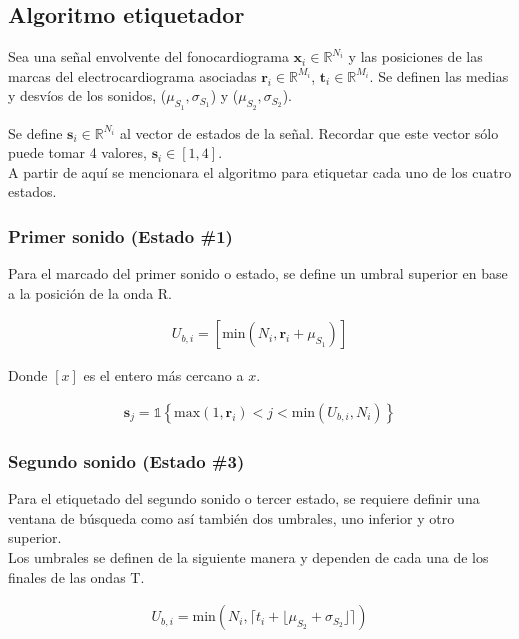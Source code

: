 \subsection*{Algoritmo etiquetador}

\indent Sea una señal envolvente del fonocardiograma $\bm{x}_i \in \mathbb{R}^{N_i}$ y las posiciones de las marcas del electrocardiograma asociadas $\bm{r}_i \in \mathbb{R}^{M_i}$, $\mathbf{t}_i \in \mathbb{R}^{M_i}$. Se definen las medias y desvíos de los sonidos, ($\mu_{S_1}, \sigma_{S_1}$) y ($\mu_{S_2}, \sigma_{S_2}$). \bigskip

\indent Se define $\mathbf{s}_i \in \mathbb{R}^{N_i}$ al vector de estados de la señal. Recordar que este vector sólo puede tomar 4 valores, $\mathbf{s}_i \in [1,4]$. \\
\indent A partir de aquí se mencionara el algoritmo para etiquetar cada uno de los cuatro estados.

\subsubsection*{Primer sonido (Estado \#1)}

\indent Para el marcado del primer sonido o estado, se define un umbral superior en base a la posición de la onda R. 

\begin{align}
    U_{b,i} = \left[\mathrm{min}(N_i,\mathbf{r}_i+\mu_{S_1})\right] 
\end{align}

\indent Donde $[x]$ es el entero más cercano a $x$.

\begin{align}
    \bm{s}_j = \mathds{1}\left\{\mathrm{max}(1, \mathbf{r}_i) < j < \mathrm{min}(U_{b,i}, N_i)\right\}
\end{align}

\subsubsection*{Segundo sonido (Estado \#3)}

\indent Para el etiquetado del segundo sonido o tercer estado, se requiere definir una ventana de búsqueda como así también dos umbrales, uno inferior y otro superior. \\
\indent Los umbrales se definen de la siguiente manera y dependen de cada una de los finales de las ondas T.

\begin{align}
    U_{b,i} = \mathrm{min}(N_i,\lceil t_i+\lfloor \mu_{S_2} + \sigma_{S_2} \rfloor \rceil)
\end{align}

